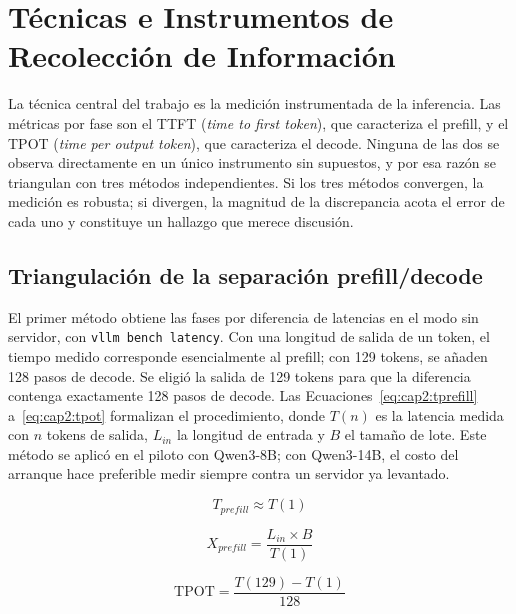 \section{Técnicas e Instrumentos de Recolección de Información}
\label{sec:cap2:tecnicas}

La técnica central del trabajo es la medición instrumentada de la inferencia. Las métricas por fase son el TTFT (\textit{time to first token}), que caracteriza el prefill, y el TPOT (\textit{time per output token}), que caracteriza el decode. Ninguna de las dos se observa directamente en un único instrumento sin supuestos, y por esa razón se triangulan con tres métodos independientes. Si los tres métodos convergen, la medición es robusta; si divergen, la magnitud de la discrepancia acota el error de cada uno y constituye un hallazgo que merece discusión.

\subsection{Triangulación de la separación prefill/decode}
\label{sec:cap2:triangulacion}

El primer método obtiene las fases por diferencia de latencias en el modo sin servidor, con \texttt{vllm bench latency}. Con una longitud de salida de un token, el tiempo medido corresponde esencialmente al prefill; con 129 tokens, se añaden 128 pasos de decode. Se eligió la salida de 129 tokens para que la diferencia contenga exactamente 128 pasos de decode. Las Ecuaciones~\ref{eq:cap2:tprefill} a~\ref{eq:cap2:tpot} formalizan el procedimiento, donde $T(n)$ es la latencia medida con $n$ tokens de salida, $L_{in}$ la longitud de entrada y $B$ el tamaño de lote. Este método se aplicó en el piloto con Qwen3-8B; con Qwen3-14B, el costo del arranque hace preferible medir siempre contra un servidor ya levantado.

\begin{equation}
\label{eq:cap2:tprefill}
T_{prefill} \approx T(1)
\end{equation}

\begin{equation}
\label{eq:cap2:xprefill}
X_{prefill} = \frac{L_{in} \times B}{T(1)}
\end{equation}

\begin{equation}
\label{eq:cap2:tpot}
\mathrm{TPOT} = \frac{T(129) - T(1)}{128}
\end{equation}

